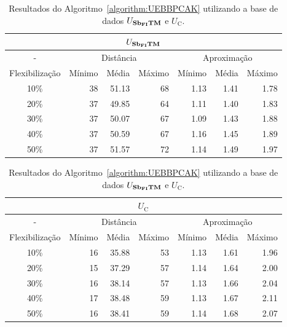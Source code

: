 \begin{table}[!htb]
  \caption{Resultados do Algoritmo~\ref{algorithm:UEBBPCAK} utilizando a base de dados $U_{\textbf{Sb\textsubscript{FI}TM}}{}$ e $U_{\text{C}}$.}
  \label{table:OAYXLAOR}
  \centering
  \begin{tabular}{|c|r|r|r|r|r|r|}
    \hline
    \multicolumn{7}{|c|}{$U_{\textbf{Sb\textsubscript{FI}TM}}{}$}                                                                      \\ \hline
      -            & \multicolumn{3}{c|}{Distância}             & \multicolumn{3}{c|}{Aproximação}           \\ \hline
    Flexibilização & Mínimo       & Média        & Máximo       & Mínimo       & Média        & Máximo       \\ \hline  
    10\%           & 38           & 51.13        & 68           & 1.13         & 1.41         & 1.78         \\ \hline
    20\%           & 37           & 49.85        & 64           & 1.11         & 1.40         & 1.83         \\ \hline
    30\%           & 37           & 50.07        & 67           & 1.09         & 1.43         & 1.88         \\ \hline
    40\%           & 37           & 50.59        & 67           & 1.16         & 1.45         & 1.89         \\ \hline
    50\%           & 37           & 51.57        & 72           & 1.14         & 1.49         & 1.97         \\ \hline    
  \end{tabular}

  \vspace{5mm}

  \begin{tabular}{|c|r|r|r|r|r|r|}
    \hline
    \multicolumn{7}{|c|}{$U_{\text{C}}$}                                                                     \\ \hline
      -            & \multicolumn{3}{c|}{Distância}             & \multicolumn{3}{c|}{Aproximação}           \\ \hline
    Flexibilização & Mínimo       & Média        & Máximo       & Mínimo       & Média        & Máximo       \\ \hline  
    10\%           & 16           & 35.88        & 53           & 1.13         & 1.61         & 1.96         \\ \hline
    20\%           & 15           & 37.29        & 57           & 1.14         & 1.64         & 2.00         \\ \hline
    30\%           & 16           & 38.14        & 57           & 1.13         & 1.66         & 2.04         \\ \hline
    40\%           & 17           & 38.48        & 59           & 1.13         & 1.67         & 2.11         \\ \hline
    50\%           & 16           & 38.41        & 59           & 1.14         & 1.68         & 2.07         \\ \hline    
  \end{tabular}
\end{table}

